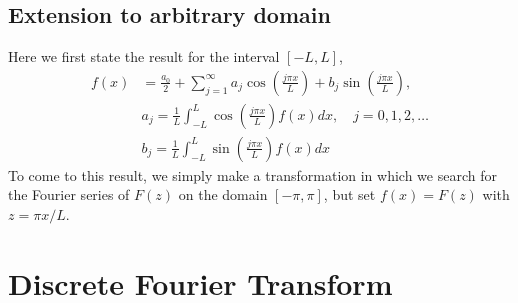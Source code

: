 \documentclass[11pt,a4paper]{report}
\theoremstyle{definition}
\begin{document}
	\subsection{Extension to arbitrary domain}
	Here we first state the result for the interval $[-L,L]$,
	\begin{align*}
		f(x) &= \frac{a_0}{2} + \sum_{j=1}^{\infty} a_j \cos \left(\frac{j\pi x}{L}\right) + b_j \sin \left(\frac{j\pi x}{L}\right),\\
			&a_j = \frac{1}{L} \int_{-L}^{L} \cos \left(\frac{j\pi x}{L}\right) f(x) dx, \quad j=0,1,2,\dots \\
			&b_j = \frac{1}{L} \int_{-L}^{L} \sin \left(\frac{j\pi x}{L}\right) f(x) dx
	\end{align*}
	To come to this result, we simply make a transformation in which we search for the Fourier series of $F(z)$ on the domain $[-\pi,\pi]$, but set $f(x)=F(z)$ with $z=\pi x/L$.
\section{Discrete Fourier Transform}
\end{document}
